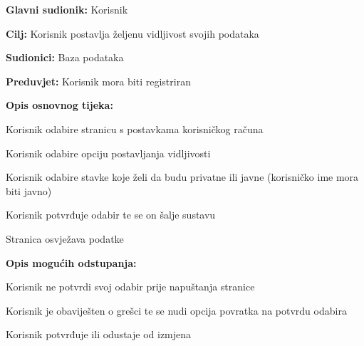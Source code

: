 				\noindent {}
				\begin{packed_item}
					
					\item \textbf{Glavni sudionik: }Korisnik
					\item  \textbf{Cilj:} Korisnik postavlja željenu vidljivost svojih podataka
					\item  \textbf{Sudionici:} Baza podataka
					\item  \textbf{Preduvjet:} Korisnik mora biti registriran
					\item  \textbf{Opis osnovnog tijeka:}
					
					\item[] \begin{packed_enum}
						
						\item Korisnik odabire stranicu s postavkama korisničkog računa
						\item Korisnik odabire opciju postavljanja vidljivosti
						\item Korisnik odabire stavke koje želi da budu privatne ili javne (korisničko ime mora biti javno)
						\item Korisnik potvrđuje odabir te se on šalje sustavu
						\item Stranica osvježava podatke
					\end{packed_enum}

					\item  \textbf{Opis mogućih odstupanja:}
					
					\item[] \begin{packed_item}
 
						\item[4.a] Korisnik ne potvrdi svoj odabir prije napuštanja stranice
						\item[] \begin{packed_enum}
							
							\item Korisnik je obaviješten o grešci te se nudi opcija povratka na potvrdu odabira
							\item Korisnik potvrđuje ili odustaje od izmjena
							
						\end{packed_enum}	
					\end{packed_item}
				\end{packed_item}

